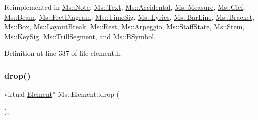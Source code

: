 Reimplemented in \hyperlink{class_ms_1_1_note_abaffbc8698b96263bb1d9b3f4b69c63e}{Ms\+::\+Note}, \hyperlink{class_ms_1_1_text_ad2cd890960721f25a8d4721031fa45f8}{Ms\+::\+Text}, \hyperlink{class_ms_1_1_accidental_a2f343b18d3b10a4fa5e87c35afe80f58}{Ms\+::\+Accidental}, \hyperlink{class_ms_1_1_measure_a5964d737ffa873b7772cbf81e0092987}{Ms\+::\+Measure}, \hyperlink{class_ms_1_1_clef_ae91b3164063b5e25e704fdcd4fa292a3}{Ms\+::\+Clef}, \hyperlink{class_ms_1_1_beam_a4ef234c092024c3b6c0c0039ce27c6c9}{Ms\+::\+Beam}, \hyperlink{class_ms_1_1_fret_diagram_ab864841b949f7e5e5f16d93606b40896}{Ms\+::\+Fret\+Diagram}, \hyperlink{class_ms_1_1_time_sig_aabc454ee0c8f3f218bbfb6767d6e7212}{Ms\+::\+Time\+Sig}, \hyperlink{class_ms_1_1_lyrics_ac43270be909641564ad6ded9af47cafa}{Ms\+::\+Lyrics}, \hyperlink{class_ms_1_1_bar_line_a28c7d6fe82e930ac1015e4a0f74d7cca}{Ms\+::\+Bar\+Line}, \hyperlink{class_ms_1_1_bracket_aaa614e8c10e3b8106c21b8f54f1f2530}{Ms\+::\+Bracket}, \hyperlink{class_ms_1_1_box_adea5343e08360e710da1b62a55e61c28}{Ms\+::\+Box}, \hyperlink{class_ms_1_1_layout_break_a69134cfdef22b53fdbb0e14a5c8705d8}{Ms\+::\+Layout\+Break}, \hyperlink{class_ms_1_1_rest_a0b2f2d3aec34bcd9ce047b60577d12df}{Ms\+::\+Rest}, \hyperlink{class_ms_1_1_arpeggio_a5d4feb5b9eb35c1afb9e14a7e0fad66b}{Ms\+::\+Arpeggio}, \hyperlink{class_ms_1_1_staff_state_a921c2d01ac4a6528ccd68f90c4a1918b}{Ms\+::\+Staff\+State}, \hyperlink{class_ms_1_1_stem_ac3edf3dc5966fcded6e5fcc8f1fb13d6}{Ms\+::\+Stem}, \hyperlink{class_ms_1_1_key_sig_a87cd45c1e8bd14b8da2889dc5ccbd4e9}{Ms\+::\+Key\+Sig}, \hyperlink{class_ms_1_1_trill_segment_aec0e095f72a35b9287721214ffb68b9f}{Ms\+::\+Trill\+Segment}, and \hyperlink{class_ms_1_1_b_symbol_afaf2195aeb8f8d2352a593a3bc3cb2d4}{Ms\+::\+B\+Symbol}.



Definition at line 337 of file element.\+h.

\mbox{\label{class_ms_1_1_element_a0ca69a9fb48e7b9fb481aacaf3860032}} 
\subsubsection{\texorpdfstring{drop()}{drop()}}
{\footnotesize\ttfamily virtual \hyperlink{class_ms_1_1_element}{Element}$\ast$ Ms\+::\+Element\+::drop (\begin{DoxyParamCaption}\item[{\hyperlink{class_ms_1_1_edit_data}{Edit\+Data} \&}]{ }\end{DoxyParamCaption})\hspace{0.3cm}{\ttfamily [inline]}, {\ttfamily [virtual]}}


